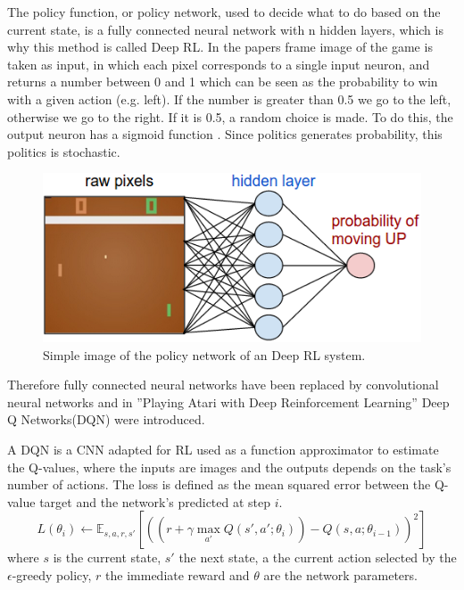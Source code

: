 The policy function, or policy network, used to decide what to do based on the current state, is a fully connected neural network with n hidden layers, which is why this method is called Deep RL. In the papers frame image of the game is taken as input, in which each pixel corresponds to a single input neuron, and returns a number between 0 and 1 which can be seen as the probability to win with a given action (e.g. left). If the number is greater than 0.5 we go to the left, otherwise we go to the right. If it is 0.5, a random choice is made. To do this, the output neuron has a sigmoid function \cite{mnih2013playing}\cite{karpathy2016deep}.
Since politics generates probability, this politics is stochastic.

\begin{figure}[ht]
  \centering
  \includegraphics[scale=0.4]{images/DRL_network.png}
  \caption{Simple image of the policy network of an Deep RL system.}
  \label{fig:DRL_network}
\end{figure}

Therefore fully connected neural networks have been replaced by convolutional neural networks and in ”Playing Atari
with Deep Reinforcement Learning” \cite{mnih2013playing} Deep Q Networks(DQN) were introduced.

A DQN is a CNN adapted for RL used as a function approximator to estimate the Q-values, where the inputs are images and the outputs depends on the task's number of actions.
The loss is defined as the mean squared error between the Q-value target and the network's predicted at step $i$.
\begin{equation*}
    L(\theta_i) \leftarrow \mathbb{E}_{s, a, r, s'} [((r + \gamma \max_{a'} Q(s', a'; \theta_i)) - Q(s, a; \theta_{i-1}))^2]    
\end{equation*}
where $s$ is the current state, $s'$ the next state, a the current action selected by the $\epsilon$-greedy policy, $r$ the immediate reward and $\theta$ are the network parameters.

